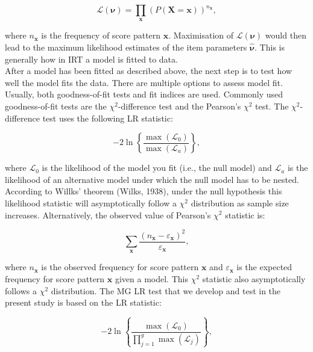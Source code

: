 \documentclass[Royal,sageapa,times,doublespace]{sagej}
\begin{document}
\begin{equation}
\mathcal{L}(\boldsymbol{\nu}) = \prod_{\boldsymbol{x}} (P(\boldsymbol{X} = \boldsymbol{x}))^{n_{\boldsymbol{x}}},
\end{equation}

where $n_{\boldsymbol{x}}$ is the frequency of score pattern $\boldsymbol{x}$. Maximisation of $\mathcal{L}(\boldsymbol{\nu})$ would then lead to the maximum likelihood estimates of the item parameters $\boldsymbol{\hat{\nu}}$. This is generally how in IRT a model is fitted to data. \\
\indent After a model has been fitted as described above, the next step is to test how well the model fits the data. There are multiple options to assess model fit. Usually, both goodness-of-fit tests and fit indices are used. Commonly used goodness-of-fit tests are the $\chi^2$-difference test and the Pearson's $\chi^2$ test. The $\chi^2$-difference test uses the following LR statistic:

\begin{equation}
- 2 \ln \left \{ \frac{\max(\mathcal{L}_0)}{\max(\mathcal{L}_a)} \right \},
\end{equation}

where $\mathcal{L}_0$ is the likelihood of the model you fit (i.e., the null model) and $\mathcal{L}_a$ is the likelihood of an alternative model under which the null model has to be nested. According to Willks' theorem (Wilks, 1938), under the null hypothesis this likelihood statistic will asymptotically follow a $\chi^2$ distribution as sample size increases. Alternatively, the observed value of Pearson's $\chi^2$ statistic is:

\begin{equation}
\sum_{\boldsymbol{x}} \frac{(n_{\boldsymbol{x}} - \varepsilon_{\boldsymbol{x}})^2}{\varepsilon_{\boldsymbol{x}}},
\end{equation}

where $n_{\boldsymbol{x}}$ is the observed frequency for score pattern $\boldsymbol{x}$ and $\varepsilon_{\boldsymbol{x}}$ is the expected frequency for score pattern $\boldsymbol{x}$ given a model. This $\chi^2$ statistic also asymptotically follows a $\chi^2$ distribution. The MG LR test that we develop and test in the present study is based on the LR statistic: 

\begin{equation}
-2 \ln \left \{ \frac{\max(\mathcal{L}_0)}{\prod_{j = 1}^g \max(\mathcal{L}_j)} \right \},
\end{equation}
 
\end{document}
